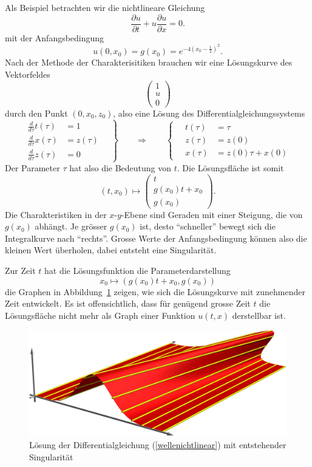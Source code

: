 Als Beispiel betrachten wir die nichtlineare Gleichung 
\begin{equation}
\frac{\partial u}{\partial t}+u\frac{\partial u}{\partial x}=0.
\label{wellenichtlinear}
\end{equation}
mit der Anfangsbedingung 
\[
u(0,x_0)=g(x_0)=e^{-4(x_0-\frac12)^2}.
\]
Nach der Methode der Charakterisitiken brauchen wir eine Lösungskurve
des Vektorfeldes
\[
\begin{pmatrix}
1\\
u\\
0
\end{pmatrix}
\]
durch den Punkt $(0,x_0, z_0)$, also eine Lösung des Differentialgleichungssystems
\[
\left.
\begin{aligned}
\frac{d}{d\tau} t(\tau)&=1\\
\frac{d}{d\tau} x(\tau)&=z(\tau)\\
\frac{d}{d\tau} z(\tau)&=0
\end{aligned}
\quad
\right\}
\qquad
\Rightarrow
\qquad
\left\{
\quad
\begin{aligned}
t(\tau)&=\tau\\
z(\tau)&=z(0)\\
x(\tau)&=z(0)\tau +x(0)
\end{aligned}
\right.
\]
Der Parameter $\tau$ hat also die Bedeutung von $t$.
Die Lösungsfläche ist somit
\[
(t,x_0)\mapsto
\begin{pmatrix}
t\\
g(x_0)t+x_0\\
g(x_0)
\end{pmatrix}.
\]
Die Charakteristiken in der $x$-$y$-Ebene sind Geraden mit einer
Steigung, die von $g(x_0)$ abhängt. Je grösser $g(x_0)$ ist, desto
``schneller'' bewegt sich die Integralkurve nach ``rechts''. Grosse
Werte der Anfangsbedingung können also die kleinen Wert überholen,
dabei entsteht eine Singularität.

Zur Zeit $t$ hat die Lösungsfunktion die Parameterdarstellung
\[
x_0\mapsto (g(x_0)t+x_0,g(x_0))
\]
die Graphen in Abbildung~\ref{g} zeigen, wie sich die Lösungskurve
mit zunehmender Zeit entwickelt.
Es ist offensichtlich, dass für genügend grosse Zeit $t$ die
Lösungsfläche nicht mehr als Graph einer Funktion $u(t,x)$ derstellbar ist.
\begin{figure}
\begin{center}
\includegraphics[width=\hsize]{../common/graphics/welle.jpg}
\end{center}
\caption{Lösung der Differentialgleichung (\ref{wellenichtlinear}) mit
entstehender Singularität\label{g}}
\end{figure}

